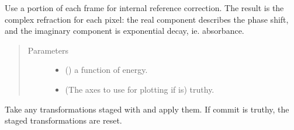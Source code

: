 \documentclass[letterpaper,10pt,english]{sphinxmanual}
\begin{document}
\begin{fulllineitems}
\begin{fulllineitems}
\begin{quote}
\begin{description}
\begin{itemize}
\end{itemize}

\end{description}\end{quote}

\end{fulllineitems}


\begin{fulllineitems}
\label{\detokenize{xanespy:xanespy.xanes_frameset.XanesFrameset.apply_internal_reference}}
Use a portion of each frame for internal reference correction. The
result is the complex refraction for each pixel: the real
component describes the phase shift, and the imaginary
component is exponential decay, ie. absorbance.
\begin{quote}\begin{description}
\item[{Parameters}] \leavevmode\begin{itemize}
\item {} 
 (\sphinxstyleliteralemphasis{, }) \textendash{} a function of energy.

\item {} 
 (The axes to use for plotting if  is) \textendash{} truthy.

\end{itemize}

\end{description}\end{quote}

\end{fulllineitems}


\begin{fulllineitems}
\label{\detokenize{xanespy:xanespy.xanes_frameset.XanesFrameset.apply_transformations}}
Take any transformations staged with 
and apply them. If commit is truthy, the staged
transformations are reset.


\end{fulllineitems}
\end{fulllineitems}
\end{document}
